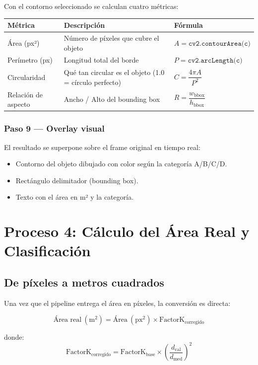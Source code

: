 \documentclass[12pt, a4paper]{article}
\begin{document}
Con el contorno seleccionado se calculan cuatro métricas:

\begin{center}
\begin{tabularx}{\textwidth}{lXl}
\toprule
\textbf{Métrica} & \textbf{Descripción} & \textbf{Fórmula} \\
\midrule
Área (px²) & Número de píxeles que cubre el objeto &
  $A = \texttt{cv2.contourArea(c)}$ \\[0.3cm]
Perímetro (px) & Longitud total del borde &
  $P = \texttt{cv2.arcLength(c)}$ \\[0.3cm]
Circularidad & Qué tan circular es el objeto (1.0 = círculo perfecto) &
  $C = \dfrac{4\pi A}{P^2}$ \\[0.4cm]
Relación de aspecto & Ancho / Alto del bounding box &
  $R = \dfrac{w_{\text{bbox}}}{h_{\text{bbox}}}$ \\
\bottomrule
\end{tabularx}
\end{center}

\subsubsection{Paso 9 — Overlay visual}

El resultado se superpone sobre el frame original en tiempo real:
\begin{itemize}
  \item Contorno del objeto dibujado con color según la categoría A/B/C/D.
  \item Rectángulo delimitador (bounding box).
  \item Texto con el área en m² y la categoría.
\end{itemize}

\section{Proceso 4: Cálculo del Área Real y Clasificación}

\subsection{De píxeles a metros cuadrados}

Una vez que el pipeline entrega el área en píxeles, la conversión es directa:

\begin{formulabox}[title=Fórmula central de medición]
$$\text{Área real}\ (\text{m}^2) = \text{Área}\ (\text{px}^2) \times \text{FactorK}_{\text{corregido}}$$

donde:
$$\text{FactorK}_{\text{corregido}} = \text{FactorK}_{\text{base}} \times \left(\frac{d_{\text{cal}}}{d_{\text{med}}}\right)^2$$
\end{formulabox}
\end{document}
